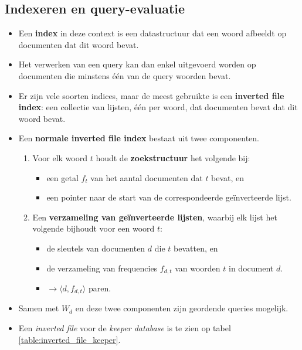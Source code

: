 \subsection{Indexeren en query-evaluatie}
\begin{itemize}
    \item Een \textbf{index} in deze context is een datastructuur dat een woord afbeeldt op documenten dat dit woord bevat.
    \item Het verwerken van een query kan dan enkel uitgevoerd worden op documenten die minstens één van de query woorden bevat.
    \item Er zijn vele soorten indices, maar de meest gebruikte is een \textbf{inverted file index}: een collectie van lijsten, één per woord, dat documenten bevat dat dit woord bevat.

    \item Een \textbf{normale inverted file index} bestaat uit twee componenten. 
    \begin{enumerate}
        \item Voor elk woord $t$ houdt de \textbf{zoekstructuur} het volgende bij:
        \begin{itemize}
            \item een getal $f_t$ van het aantal documenten dat $t$ bevat, en 
            \item een pointer naar de start van de correspondeerde geïnverteerde lijst.
        \end{itemize}
        \item Een \textbf{verzameling van geïnverteerde lijsten}, waarbij elk lijst het volgende bijhoudt voor een woord $t$:
        \begin{itemize}
            \item de sleutels van documenten $d$ die $t$ bevatten, en 
            \item de verzameling van frequencies $f_{d,t}$ van woorden $t$ in document $d$.
            \item $\rightarrow \langle d, f_{d,t}\rangle$ paren.
        \end{itemize}
    \end{enumerate}
    \item Samen met $W_{d}$ en deze twee componenten zijn geordende queries mogelijk.
    \item Een \textit{inverted file} voor de \textit{keeper database} is te zien op tabel \ref{table:inverted_file_keeper}.



\end{itemize}
